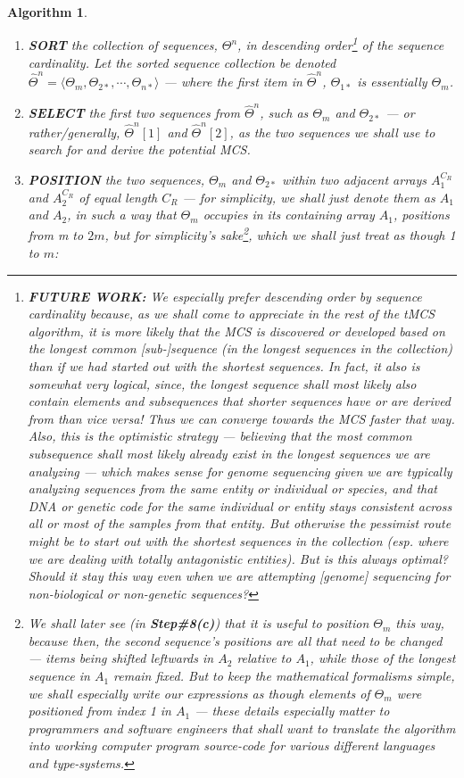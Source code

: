 \documentclass[a4paper, 18pt]{book} %
\newtheorem{alg}{Algorithm}
\begin{document}
\begin{alg}
\begin{enumerate}
{}
\item{
\textbf{SORT}  the collection of sequences, $\Theta^n$, in descending order\footnote{\textbf{FUTURE WORK:} We especially prefer descending order by sequence cardinality because, as we shall come to appreciate in the rest of the tMCS algorithm, it is more likely that the MCS is discovered or developed based on the longest  common [sub-]sequence (in the longest sequences in the collection) than if we had started out with the shortest sequences. In fact, it also is somewhat very logical, since, the longest sequence shall most likely also contain elements and subsequences that shorter sequences have or are derived from than vice versa! Thus we can converge towards the MCS faster that way. Also, this is \textit{the optimistic strategy} --- believing that the most common subsequence shall most likely already exist in the longest sequences we are analyzing --- which makes sense for genome sequencing given we are typically analyzing sequences from the same entity or individual or species, and that DNA or genetic code for the same individual or entity stays consistent across all or most of the samples from that entity. But otherwise the pessimist route might be to start out with the shortest sequences in the collection (esp. where we are dealing with totally antagonistic entities). But is this always optimal? Should it stay this way even when we are attempting [genome] sequencing for non-biological or non-genetic sequences?} of the sequence cardinality. Let the sorted sequence collection be denoted ${\hat{\Theta}}^n = \langle \Theta_m, \Theta_{2*}, \cdots , \Theta_{n*} \rangle$ --- where the first item in ${\hat{\Theta}}^n$, $\Theta_{1*}$ is essentially $\Theta_m$.
}
\item{
\textbf{SELECT}  the first two sequences from ${\hat{\Theta}}^n$, such as  $\Theta_m$ and $\Theta_{2*}$ --- or rather/generally, ${\hat{\Theta}}^n[1]$ and ${\hat{\Theta}}^n[2]$, as the two sequences we shall use to search for and derive the potential MCS.
}
\item { \textbf{POSITION} the two sequences, $\Theta_m$ and $\Theta_{2*}$ within two adjacent arrays $A_1^{C_R}$ and $A_2^{C_R}$ of equal length $C_R$ --- for simplicity, we shall just denote them as  $A_1$ and $A_2$, in such a way that $\Theta_m$ occupies in its containing array $A_1$, positions from m to $2m$, but for simplicity's sake\footnote{We shall later see (in \textbf{Step\#8(c)}) that it is useful to position $\Theta_m$ this way, because then, the second sequence's positions are all that need to be changed --- items being shifted leftwards in $A_2$ relative to $A_1$, while those of the longest sequence in $A_1$ remain fixed. But to keep the mathematical formalisms simple, we shall especially write our expressions as though elements of $\Theta_m$ were positioned from index 1 in $A_1$ --- these details especially matter to programmers and software engineers that shall want to translate the algorithm into working computer program source-code for various different languages and type-systems.}, which we shall just treat as though 1 to $m$:

}
\end{enumerate}
\end{alg}
\end{document}

